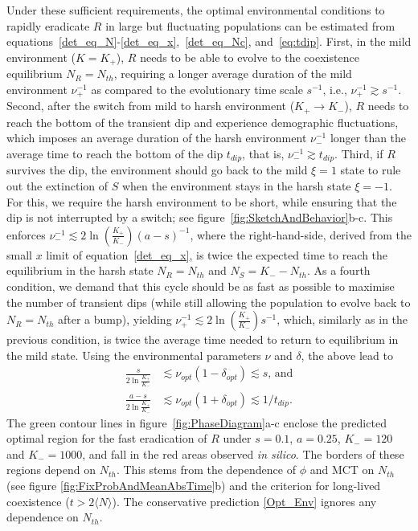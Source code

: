 \documentclass{article}
\begin{document}
Under these sufficient requirements, the optimal environmental conditions to rapidly eradicate $R$ in large but fluctuating populations can be estimated from equations~\eqref{det_eq_N}-\eqref{det_eq_x},~\eqref{det_eq_Nc}, and~\eqref{eq:tdip}. First, in the mild  environment (\(K=K_+\)), $R$ needs to be able to evolve to the coexistence equilibrium \(N_R=N_{th}\), requiring a longer average duration of the mild environment \(\nu_{+}^{-1}\) as compared to the evolutionary time scale \(s^{-1}\), i.e., \(\nu_{+}^{-1}\gtrsim s^{-1}\). Second, after the switch from mild to harsh environment (\(K_+\rightarrow K_-\)), $R$ needs to reach the bottom of the transient dip and experience demographic fluctuations, which imposes an average duration of the harsh environment \(\nu_{-}^{-1}\) longer than the average time to reach the bottom of the dip \(t_{dip}\), that is, \(\nu_{-}^{-1}\gtrsim t_{dip}\). Third, if $R$ survives the dip, the environment should go back to the mild $\xi=1$ state to rule out the extinction of $S$ when the environment stays in the harsh state $\xi=-1$. For this, we require the harsh environment to be short, while ensuring that the dip is not interrupted by a switch; see figure~\ref{fig:SketchAndBehavior}b-c. This enforces \(\nu_{-}^{-1}\lesssim2\ln{(\frac{K_{+}}{K_{-}})}(a-s)^{-1}\), where the right-hand-side, derived from the small \(x\) limit of equation~\eqref{det_eq_x}, is twice the expected time to reach the equilibrium in the harsh state \(N_R=N_{th}\) and \(N_S=K_--N_{th}\). As a fourth condition, we demand that this cycle should be as fast as possible to maximise the number of transient dips (while still allowing the population to evolve back to \(N_R=N_{th}\) after a bump), yielding \(\nu_{+}^{-1}\lesssim2\ln{(\frac{K_{+}}{K_{-}})}s^{-1}\), which, similarly as in the previous condition, is twice the average time needed to return to equilibrium in the mild state. Using the environmental parameters \(\nu\) and \(\delta\), the above lead to
\begin{equation}
    \begin{aligned}
        \frac{s}{2\ln{\frac{K_{+}}{K_{-}}}}&\lesssim \nu_{opt}\left(1-\delta_{opt}\right)\lesssim s\text{, and}
        \\
        \frac{a-s}{2\ln{\frac{K_{+}}{K_{-}}}}&\lesssim \nu_{opt}\left(1+\delta_{opt}\right)\lesssim 1/t_{dip}.
    \end{aligned}
    \label{Opt_Env}
\end{equation}
The green contour lines in figure~\ref{fig:PhaseDiagram}a-c enclose the predicted optimal region for the fast eradication of $R$ under \(s=0.1\), \(a=0.25\), \(K_{-}=120\) and \(K_{-}=1000\), and fall in the red areas observed {\it in silico}. The borders of these regions depend on \(N_{th}\). This stems from the dependence of \(\phi\) and MCT on \(N_{th}\) (see figure \ref{fig:FixProbAndMeanAbsTime}b) and the criterion for long-lived coexistence ($t>2\langle N\rangle$). The conservative prediction \eqref{Opt_Env} ignores any dependence on \(N_{th}\). 
\end{document}
